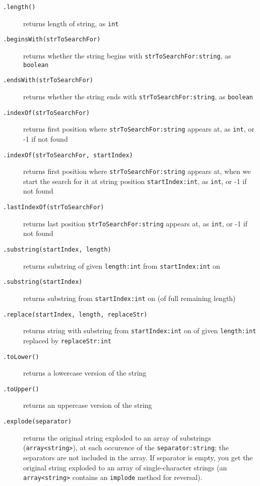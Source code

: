 \begin{description}
\item[\texttt{.length()}] returns length of string, as \texttt{int}
\item[\texttt{.beginsWith(strToSearchFor)}] returns whether the string begins with \texttt{strToSearchFor:string}, as \texttt{boolean}
\item[\texttt{.endsWith(strToSearchFor)}] returns whether the string ends with \texttt{strToSearchFor:string}, as \texttt{boolean}
\item[\texttt{.indexOf(strToSearchFor)}] returns first position where \texttt{strToSearchFor:string} appears at, as \texttt{int}, or -1 if not found
\item[\texttt{.indexOf(strToSearchFor, startIndex)}] returns first position where \texttt{strToSearchFor:string} appears at, when we start the search for it at string position \texttt{startIndex:int}, as \texttt{int}, or -1 if not found
\item[\texttt{.lastIndexOf(strToSearchFor)}] returns last position \texttt{strToSearchFor:string} appears at, as \texttt{int}, or -1 if not found
\item[\texttt{.substring(startIndex, length)}] returns substring of given \texttt{length:int} from \texttt{startIndex:int} on
\item[\texttt{.substring(startIndex)}] returns substring from \texttt{startIndex:int} on (of full remaining length)
\item[\texttt{.replace(startIndex, length, replaceStr)}] returns string with substring from \texttt{startIndex:int} on of given \texttt{length:int} replaced by \texttt{replaceStr:int}
\item[\texttt{.toLower()}] returns a lowercase version of the string
\item[\texttt{.toUpper()}] returns an uppercase version of the string
\item[\texttt{.explode(separator)}] returns the original string exploded to an array of substrings (\texttt{array<string>}), at each occurence of the \texttt{separator:string}; the separators are not included in the array. If separator is empty, you get the original string exploded to an array of single-character strings (an \texttt{array<string>} contains an \texttt{implode} method for reversal). 
\end{description}

